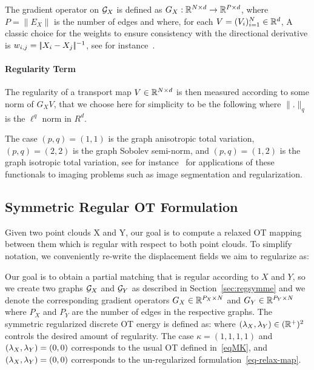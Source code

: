 The gradient operator on $\mathcal{G}_X$ is defined as $G_X : \mathbb{R}^{N \times d} \rightarrow \mathbb{R}^{P \times d}$, where $P=\|E_X\|$ is the number of edges and where, for each $V=(V_i)_{i=1}^N \in \mathbb{R}^d$, 
A classic choice for the weights to ensure consistency with the directional derivative is $w_{i,j} = |\!| X_i-X_j |\!|^{-1}$, see for instance~\cite{guilboa07}.


\paragraph{Regularity Term}

The regularity of a transport map $V \in \mathbb{R}^{N \times d}$ is then measured according to some norm of $G_X V$, that we choose here for simplicity to be the following
where $\|.\|_q$ is the $\ell^q$ norm in $R^d$. 

The case $(p,q)=(1,1)$ is the graph anisotropic total variation, $(p,q)=(2,2)$ is the graph Sobolev semi-norm, and $(p,q)=(1,2)$ is the graph isotropic total variation, see for instance~\cite{elmoataz-graph} for applications of these functionals to imaging problems such as image segmentation and regularization. 

\subsection{Symmetric Regular OT Formulation}

Given two point clouds X and Y, our goal is to compute a relaxed OT mapping between them which is regular with respect to both point clouds. To simplify notation, we conveniently re-write the displacement fields we aim to regularize as:

Our goal is to obtain a partial matching that is regular according to $X$ and $Y$, so we create two graphs $\mathcal{G}_X$ and $\mathcal{G}_Y$ as described in Section~\ref{sec:regsymme} and we denote the corresponding gradient operators $G_X \in \mathbb{R}^{P_X \times N}$ and $G_Y \in \mathbb{R}^{P_Y \times N}$ where $P_X$ and $P_Y$ are the number of edges in the respective graphs. The symmetric regularized discrete OT energy is defined as: 
where $(\lambda_X,\lambda_Y) \in (\mathbb{R}^+)^2$ controls the desired amount of regularity.
The case $\kappa=(1,1,1,1)$ and $(\lambda_X,\lambda_Y)=(0,0)$ corresponds to the usual OT defined in~\eqref{eqMK}, and $(\lambda_X,\lambda_Y)=(0,0)$ corresponds to the un-regularized formulation~\eqref{eq-relax-map}.

